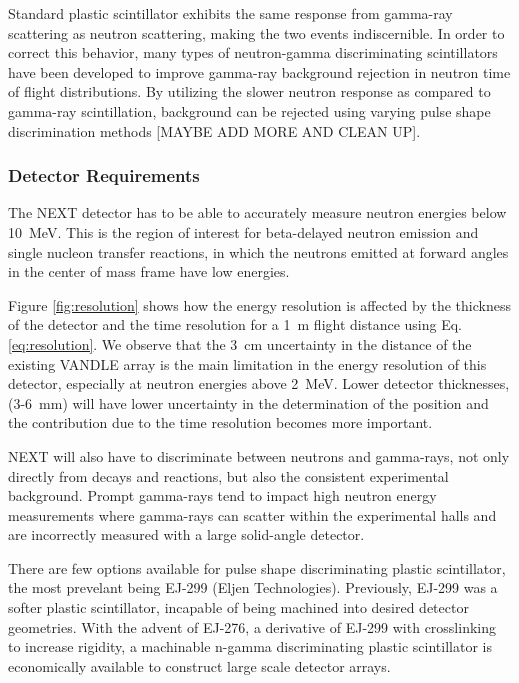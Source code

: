 \documentclass[preprint,3p,twocolumn]{elsarticle}
\begin{document}
Standard plastic scintillator exhibits the same response from gamma-ray scattering as neutron scattering, making the two events indiscernible. In order to correct this behavior, many types of neutron-gamma discriminating scintillators have been developed to improve gamma-ray background rejection in neutron time of flight distributions. By utilizing the slower neutron response as compared to gamma-ray scintillation, background can be rejected using varying pulse shape discrimination methods [MAYBE ADD MORE AND CLEAN UP].

\subsubsection{Detector Requirements}
The NEXT detector has to be able to accurately measure neutron energies below 10~MeV. This is the region of interest for beta-delayed neutron emission and single nucleon transfer reactions, in which the neutrons emitted at forward angles in the center of mass frame have low energies.  

Figure \ref{fig:resolution} shows how the energy resolution is  affected by the thickness of the detector and the time resolution for a 1~m flight distance using Eq. \eqref{eq:resolution}. We observe that the 3~cm uncertainty in the distance of the existing VANDLE \cite{PETERS2016122} array is the main limitation in the energy resolution of this detector, especially at neutron energies above 2~MeV. Lower detector thicknesses, (3-6~mm) will have lower uncertainty in the determination of the position and  the contribution due to the time resolution becomes more important.

NEXT will also have to discriminate between neutrons and gamma-rays, not only directly from decays and reactions, but also the consistent experimental background. Prompt gamma-rays tend to impact high neutron energy measurements where gamma-rays can scatter within the experimental halls and are incorrectly measured with a large solid-angle detector.

There are few options available for pulse shape discriminating plastic scintillator, the most prevelant being EJ-299 (Eljen Technologies). Previously, EJ-299 was a softer plastic scintillator, incapable of being machined into desired detector geometries. With the advent of EJ-276, a derivative of EJ-299 with crosslinking to increase rigidity, a machinable n-gamma discriminating plastic scintillator is economically available to construct large scale detector arrays.
\end{document}
